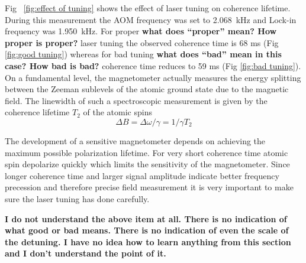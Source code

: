 \begin{itemize}
Fig~ \ref{fig:effect of tuning} shows the effect of laser tuning on
coherence lifetime. During this measurement the AOM frequency was set
to 2.068~kHz and Lock-in frequency was 1.950~kHz.  For proper {\bf
  what does ``proper'' mean?  How proper is proper?}  laser tuning the
observed coherence time is 68 ms (Fig \ref{fig:good tuning}) whereas
for bad tuning {\bf what does ``bad'' mean in this case?  How bad is
  bad?}  coherence time reduces to 59 ms (Fig \ref{fig:bad
  tuning}). On a fundamental level, the magnetometer actually measures
the energy splitting between the Zeeman sublevels of the atomic ground
state due to the magnetic field. The linewidth of such a spectroscopic
measurement is given by the coherence lifetime $T_2$ of the atomic
spins \cite{bib:Seltzer_thesis}
\begin{equation}
 \Delta B = \Delta\omega/\gamma  = 1/γ T_2
\end{equation}

The development of a sensitive magnetometer depends on achieving the
maximum possible polarization lifetime.  For very short coherence time
atomic spin depolarize quickly which limits the sensitivity of the
magnetometer.  Since longer coherence time and larger signal amplitude
indicate better frequency precession and therefore precise field
measurement it is very important to make sure the laser tuning has
done carefully.

{\bf I do not understand the above item at all.  There is no
  indication of what good or bad means.  There is no indication of
  even the scale of the detuning.  I have no idea how to learn
  anything from this section and I don't understand the point of it.}



\end{itemize}
